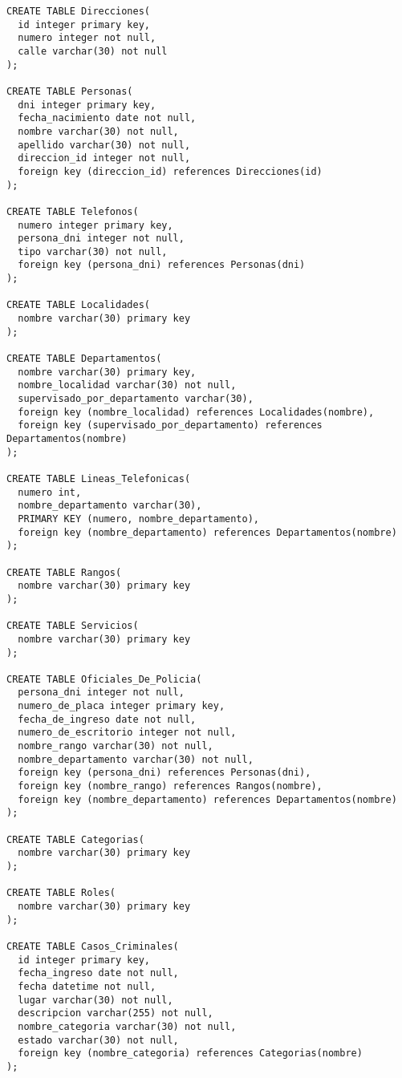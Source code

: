 \documentclass[10pt,a4paper]{article}
\begin{document}
\begin{verbatim}
CREATE TABLE Direcciones(
  id integer primary key,
  numero integer not null,
  calle varchar(30) not null 
);

CREATE TABLE Personas(
  dni integer primary key,
  fecha_nacimiento date not null,
  nombre varchar(30) not null,
  apellido varchar(30) not null,
  direccion_id integer not null,
  foreign key (direccion_id) references Direcciones(id)
);

CREATE TABLE Telefonos(
  numero integer primary key,
  persona_dni integer not null,
  tipo varchar(30) not null,
  foreign key (persona_dni) references Personas(dni)
);

CREATE TABLE Localidades(
  nombre varchar(30) primary key
);

CREATE TABLE Departamentos(
  nombre varchar(30) primary key,
  nombre_localidad varchar(30) not null,
  supervisado_por_departamento varchar(30),
  foreign key (nombre_localidad) references Localidades(nombre),
  foreign key (supervisado_por_departamento) references Departamentos(nombre)
);

CREATE TABLE Lineas_Telefonicas(
  numero int,
  nombre_departamento varchar(30),
  PRIMARY KEY (numero, nombre_departamento),
  foreign key (nombre_departamento) references Departamentos(nombre)
);

CREATE TABLE Rangos(
  nombre varchar(30) primary key
);

CREATE TABLE Servicios(
  nombre varchar(30) primary key
);

CREATE TABLE Oficiales_De_Policia(
  persona_dni integer not null,
  numero_de_placa integer primary key,
  fecha_de_ingreso date not null,
  numero_de_escritorio integer not null,
  nombre_rango varchar(30) not null,
  nombre_departamento varchar(30) not null,
  foreign key (persona_dni) references Personas(dni),
  foreign key (nombre_rango) references Rangos(nombre),
  foreign key (nombre_departamento) references Departamentos(nombre)
);

CREATE TABLE Categorias(
  nombre varchar(30) primary key
);

CREATE TABLE Roles(
  nombre varchar(30) primary key
);

CREATE TABLE Casos_Criminales(
  id integer primary key,
  fecha_ingreso date not null,
  fecha datetime not null,
  lugar varchar(30) not null,
  descripcion varchar(255) not null,
  nombre_categoria varchar(30) not null,
  estado varchar(30) not null,
  foreign key (nombre_categoria) references Categorias(nombre)
);


\end{verbatim}
\end{document}
